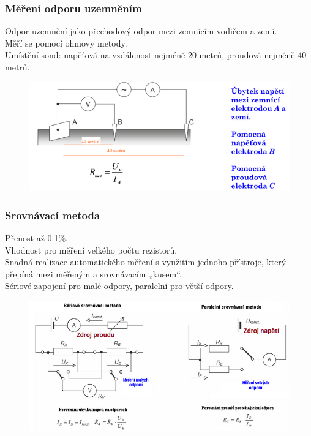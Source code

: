 \subsubsection{Měření odporu uzemněním}
Odpor uzemnění jako přechodový odpor mezi zemnícím vodičem a zemí.\\
Měří se pomocí ohmovy metody.\\
Umístění sond: napěťová na vzdálenost nejméně 20 metrů, proudová nejméně 40 metrů.\\
\begin{figure}[h!]
    \centering
    \includegraphics[scale = 0.5]{images/OdporUzem.png}
\end{figure}

\subsubsection{Srovnávací metoda}
Přenost až 0.1\%.\\
Vhodnost pro měření velkého počtu rezistorů.\\
Snadná realizace automatického měření s využitím jednoho přístroje, který přepíná mezi měřeným a srovnávacím „kusem“.\\
Sériové zapojení pro malé odpory, paralelní pro větší odpory.\\
\begin{figure}[h!]
    \centering
    \includegraphics[scale = 0.5]{images/SrovMetodOdp.png}
\end{figure}

